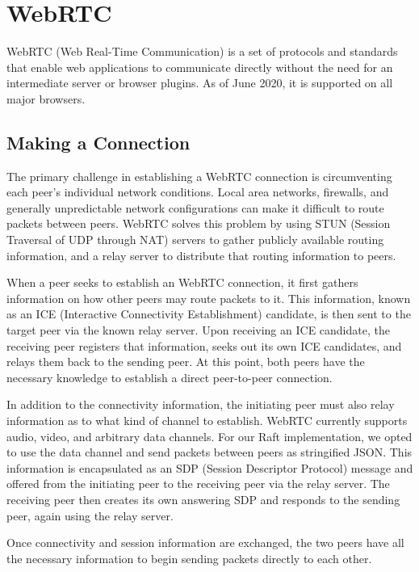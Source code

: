 \documentclass[11pt,twocolumn]{article}
\begin{document}
\section{WebRTC}

WebRTC \cite{webrtcwebsite} (Web Real-Time Communication) is a set of protocols and standards that enable web applications to communicate directly without the need for an intermediate server or browser plugins. As of June 2020, it is supported on all major browsers.

\subsection{Making a Connection}
The primary challenge in establishing a WebRTC connection is circumventing each peer's individual network conditions. Local area networks, firewalls, and generally unpredictable network configurations can make it difficult to route packets between peers. WebRTC solves this problem by using STUN (Session Traversal of UDP through NAT) servers to gather publicly available routing information, and a relay server to distribute that routing information to peers.

When a peer seeks to establish an WebRTC connection, it first gathers information on how other peers may route packets to it. This information, known as an ICE (Interactive Connectivity Establishment) candidate, is then sent to the target peer via the known relay server. Upon receiving an ICE candidate, the receiving peer registers that information, seeks out its own ICE candidates, and relays them back to the sending peer. At this point, both peers have the necessary knowledge to establish a direct peer-to-peer connection.

In addition to the connectivity information, the initiating peer must also relay information as to what kind of channel to establish. WebRTC currently supports audio, video, and arbitrary data channels. For our Raft implementation, we opted to use the data channel and send packets between peers as stringified JSON. This information is encapsulated as an SDP (Session Descriptor Protocol) message and offered from the initiating peer to the receiving peer via the relay server. The receiving peer then creates its own answering SDP and responds to the sending peer, again using the relay server.

Once connectivity and session information are exchanged, the two peers have all the necessary information to begin sending packets directly to each other.
\end{document}
